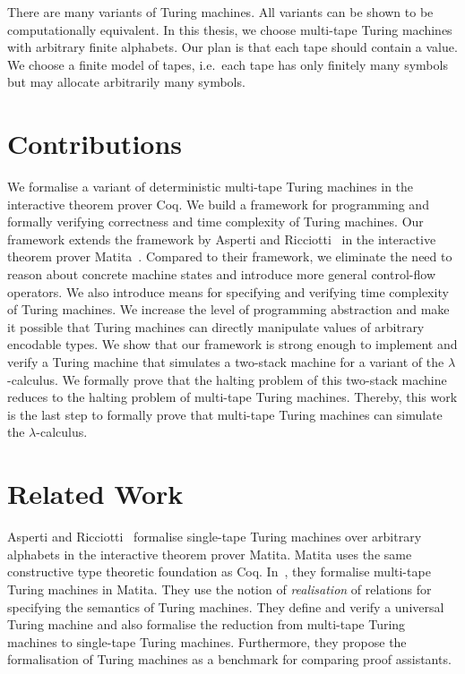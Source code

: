 There are many variants of Turing machines.  All variants can be shown to be computationally equivalent.  In this thesis, we choose multi-tape Turing
machines with arbitrary finite alphabets.  Our plan is that each tape should contain a value.  We choose a finite model of tapes, i.e.\ each tape has
only finitely many symbols but may allocate arbitrarily many symbols.


\section{Contributions}
\label{sec:contributions}

We formalise a variant of deterministic multi-tape Turing machines in the interactive theorem prover Coq.  We build a framework for programming and
formally verifying correctness and time complexity of Turing machines.  Our framework extends the framework by Asperti and
Ricciotti~\cite{asperti2015} in the interactive theorem prover Matita~\cite{asperti2011matita}.  Compared to their framework, we eliminate the need to
reason about concrete machine states and introduce more general control-flow operators.  We also introduce means for specifying and verifying time
complexity of Turing machines.  We increase the level of programming abstraction and make it possible that Turing machines can directly manipulate
values of arbitrary encodable types.  We show that our framework is strong enough to implement and verify a Turing machine that simulates a two-stack
machine for a variant of the $\lambda$-calculus.  We formally prove that the halting problem of this two-stack machine reduces to the halting problem
of multi-tape Turing machines.  Thereby, this work is the last step to formally prove that multi-tape Turing machines can simulate the
$\lambda$-calculus.

\section{Related Work}
\label{sec:relatedwork}

Asperti and Ricciotti~\cite{asperti2012} formalise single-tape Turing machines over arbitrary alphabets in the interactive theorem prover Matita.
Matita uses the same constructive type theoretic foundation as Coq.  In~\cite{asperti2015}, they formalise multi-tape Turing machines in Matita.  They
use the notion of \textit{realisation} of relations for specifying the semantics of Turing machines.  They define and verify a universal Turing
machine and also formalise the reduction from multi-tape Turing machines to single-tape Turing machines.  Furthermore, they propose the formalisation
of Turing machines as a benchmark for comparing proof assistants.

